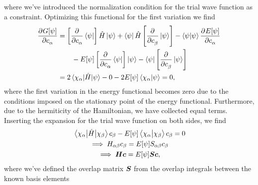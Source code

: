             where we've introduced the normalization condition for the trial
            wave function as a constraint.
            Optimizing this functional for the first variation we find
            \begin{align}
                \dpd[]{G[\psi]}{c_{\alpha}}
                &=
                \brak{
                    \dpd[]{}{c_{\alpha}}
                    \bra{\psi}
                }\hamil\ket{\psi}
                + \bra{\psi}\hamil
                \brak{
                    \dpd[]{}{c_{\beta}}
                    \ket{\psi}
                }
                -
                \braket{\psi}{\psi}
                \dpd[]{E[\psi]}{c_{\alpha}}
                \nonumber \\
                &\qquad
                -
                E[\psi]
                \brak{
                    \dpd[]{}{c_{\alpha}}
                    \bra{\psi}
                }\ket{\psi}
                -
                \bra{\psi}
                \brak{
                    \dpd[]{}{c_{\beta}}
                    \ket{\psi}
                }
                \\
                &=
                2 \mel{\chi_{\alpha}}{\hamil}{\psi}
                - 0
                - 2E[\psi]\braket{\chi_{\alpha}}{\psi}
                = 0,
            \end{align}
            where the first variation in the energy functional becomes zero due
            to the conditions imposed on the stationary point of the energy
            functional.
            Furthermore, due to the hermiticity of the Hamiltonian, we have
            collected equal terms.
            Inserting the expansion for the trial wave function on both sides,
            we find
            \begin{gather}
                \mel{\chi_{\alpha}}{\hat{H}}{\chi_{\beta}} c_{\beta}
                - E[\psi]\braket{\chi_{\alpha}}{\chi_{\beta}} c_{\beta}
                = 0
                \\
                \implies
                H_{\alpha\beta} c_{\beta}
                = E[\psi] S_{\alpha\beta} c_{\beta}
                \\
                \implies
                \boldsymbol{H} \boldsymbol{c}
                = E[\psi] \boldsymbol{S} \boldsymbol{c},
                \label{eq:variational-eigenvalue}
            \end{gather}
            where we've defined the overlap matrix $\boldsymbol{S}$ from the
            overlap integrals between the known basis elements

